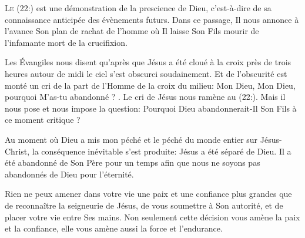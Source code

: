 


\lettrine{L}{e (22:)} est une démonstration
 de la prescience de Dieu, c'est-à-dire de sa connaissance anticipée
 des évènements futurs.
 Dans ce passage, Il nous annonce à l'avance Son plan de rachat
 de l'homme où Il laisse Son Fils mourir de l'infamante mort de la crucifixion.

Les Évangiles nous disent qu'après que Jésus a
 été cloué à la croix
 près de trois heures \ocadr{}autour de midi\fcadr{} le ciel s'est obscurci soudainement.
 Et de l'obscurité est monté un cri de la part de l'Homme de la croix du milieu:
 \Og Mon Dieu, Mon Dieu, pourquoi M'as-tu abandonné ? \Fg{}.
 Le cri de Jésus nous ramène au (22:).
 Mais il nous pose et nous impose la question:
 Pourquoi Dieu abandonnerait-Il Son Fils à ce moment critique ?


Au moment où Dieu a mis mon péché \ocadr{}et le péché du monde entier\fcadr{}
 sur Jésus-Christ, la conséquence inévitable s'est produite:
 Jésus a été séparé de Dieu. Il a été abandonné de Son Père
 pour un temps afin que nous ne soyons pas abandonnés de Dieu pour l'éternité.

Rien ne peux amener dans votre vie une paix et une confiance plus grandes
 que de reconnaître la seigneurie 
 de Jésus, de vous soumettre à Son autorité,
 et de placer votre vie entre Ses mains.
 Non seulement cette décision vous amène la paix et la confiance,
 elle vous amène aussi la force et l'endurance.

\dvrule





